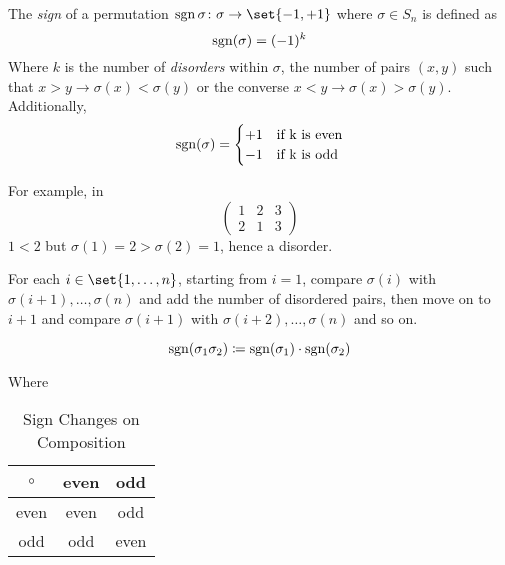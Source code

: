 \begin{definition}
    The \textit{sign} of a permutation $\Sign{\sigma} \colon \sigma \to \set{-1, +1}$ where $\sigma \in S_n$ is defined as
    \begin{equation}
        \operatorname{sgn}(\sigma) = (-1)^{k}
    \end{equation}
    Where $k$ is the number of \textit{disorders} within $\sigma$, the number of pairs $(x, y)$ such that $x > y \to \sigma(x) < \sigma(y)$ or the converse $x < y \to \sigma(x) > \sigma(y)$. Additionally,
    \begin{equation}
        \operatorname{sgn}(\sigma) = \begin{cases}
            +1 &\text{if k is even} \\
            -1 &\text{if k is odd}
        \end{cases}
    \end{equation}
\end{definition}

\begin{remark}
    For example, in
    \begin{equation*}
        \begin{pmatrix}
            1 & 2 & 3 \\
            2 & 1 & 3
        \end{pmatrix}
    \end{equation*}
    $1 < 2$ but $\sigma(1) = 2 > \sigma(2) = 1$, hence a disorder.
    
    For each $i \in \set{1, \dots, n}$, starting from $i = 1$, compare $\sigma(i)$ with $\sigma(i + 1), \dots, \sigma(n)$ and add the number of disordered pairs, then move on to $i + 1$ and compare $\sigma(i + 1)$ with $\sigma(i + 2), \dots, \sigma(n)$ and so on.
\end{remark}

\begin{theorem}
	\begin{equation}
		\operatorname{sgn}(\sigma_1 \sigma_2) \coloneqq \operatorname{sgn}(\sigma_1) \cdot \operatorname{sgn}(\sigma_2)
	\end{equation}
\end{theorem}

Where
\begin{table}[H]
\centering
\begin{tabular}{c | c c}
\toprule
$\circ$ & even & odd  \\
\midrule
even    & even & odd  \\
odd     & odd  & even \\
\bottomrule
\end{tabular}
\caption{Sign Changes on Composition}
\end{table}

